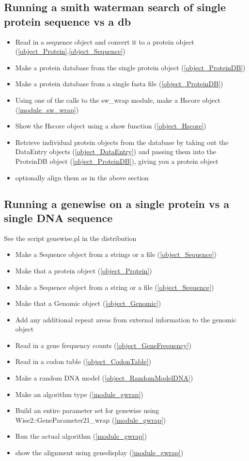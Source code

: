 \subsection{Running a smith waterman search of  single protein sequence vs a db}
\begin{itemize}
\item Read in a sequence object and convert it to a protein object (\ref{object_Protein},\ref{object_Sequence})
\item Make a protein database from the single protein object (\ref{object_ProteinDB})
\item Make a protein database from a single fasta file (\ref{object_ProteinDB})
\item Using one of the calls to the sw_wrap module, make a Hscore object (\ref{module_sw_wrap})
\item Show the Hscore object using a show function (\ref{object_Hscore})
\item Retrieve individual protein objects from the database by taking out the
DataEntry objects (\ref{object_DataEntry}) and passing them into the ProteinDB object (\ref{object_ProteinDB}), giving you a protein object
\item optionally align them as in the above section
\end{itemize}

\subsection{Running a genewise on a single protein vs a single DNA sequence}
See the script genewise.pl in the distribution
\begin{itemize}
\item Make a Sequence object from a strings or a file (\ref{object_Sequence})
\item Make that a protein object (\ref{object_Protein})
\item Make a Sequence object from a string or a file (\ref{object_Sequence})
\item Make that a Genomic object (\ref{object_Genomic})
\item Add any additional repeat areas from external information to the genomic object
\item Read in a gene frequency counts (\ref{object_GeneFrequency})
\item Read in a codon table (\ref{object_CodonTable})
\item Make a random DNA model (\ref{object_RandomModelDNA})
\item Make an algorithm type (\ref{module_gwrap})
\item Build an entire parameter set for genewise using Wise2::GeneParameter21_wrap (\ref{module_gwrap})
\item Run the actual algorithm (\ref{module_gwrap})
\item show the alignment using genedisplay (\ref{module_gwrap})
\end{itemize}

